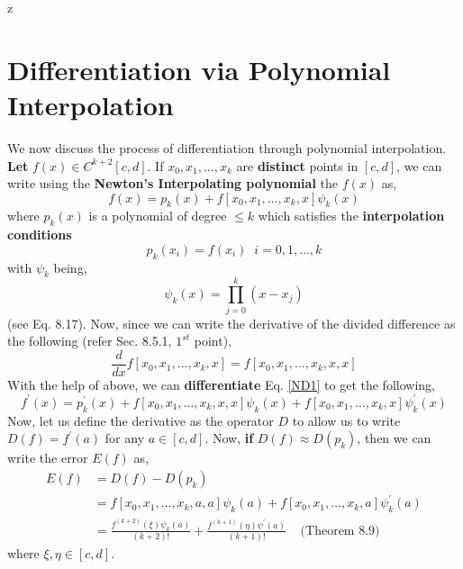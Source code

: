 z\documentclass[a4paper,12pt,twoside]{book}
\newcommand{\nll}[0]{\newline\newline}
\newcommand{\der}[2]{\frac{d #1}{d #2}}
\begin{document}
\section{Differentiation via Polynomial Interpolation}
We now discuss the process of differentiation through polynomial interpolation.
\nll
\textbf{Let} $f(x) \in C^{k+2}[c,d]$. If $x_0,x_1,\dots,x_k$ are \textbf{distinct} points in $[c,d]$, we can write using the \textbf{Newton's Interpolating polynomial} the $f(x)$ as,
\begin{equation}
\label{ND1}
    f(x) = p_k(x) + f[x_0,x_1,\dots,x_k,x]\psi_k(x)
\end{equation}
where $p_k(x)$ is a polynomial of degree $\le k$ which satisfies the \textbf{interpolation conditions}
\[p_k(x_i) = f(x_i)\;\;i=0,1,\dots,k\]
with $\psi_k$ being,
\[\psi_k(x) = \prod_{j=0}^k (x-x_j)\]
(see Eq. 8.17).
\nll
Now, since we can write the derivative of the divided difference as the following (refer Sec. 8.5.1, $1^{st}$ point),
\[\der{}{x}f[x_0,x_1,\dots,x_k,x] = f[x_0,x_1,\dots,x_k,x,x]\]
With the help of above, we can \textbf{differentiate} Eq. \ref{ND1} to get the following,
\begin{equation}
    f^\prime(x)  =p_k^\prime(x) + f[x_0,x_1,\dots,x_k,x,x]\psi_k(x) + f[x_0,x_1,\dots,x_k,x]\psi_k^\prime(x)
\end{equation}
Now, let us define the derivative as the operator $D$ to allow us to write $D(f) = f^\prime(a)$ for any $a\in[c,d]$. 
\nll
Now, \textbf{if} $D(f) \approx D(p_k)$, then we can write the error $E(f)$ as,
\begin{equation}
\label{ND2}
    \begin{split}
        E(f) &= D(f) - D(p_k)\\
        &=  f[x_0,x_1,\dots,x_k,a,a]\psi_k(a) + f[x_0,x_1,\dots,x_k,a]\psi_k^\prime(a)\\
        &= \boxed{\frac{f^{(k+2)}(\xi) \psi_k(a)}{(k+2)!} + \frac{f^{(k+1)}(\eta)\psi^\prime(a)}{(k+1)!}}\;\;\;\;\text{(Theorem 8.9)}
    \end{split}
\end{equation}
where $\xi, \eta \in [c,d]$.
\nll
\end{document}
